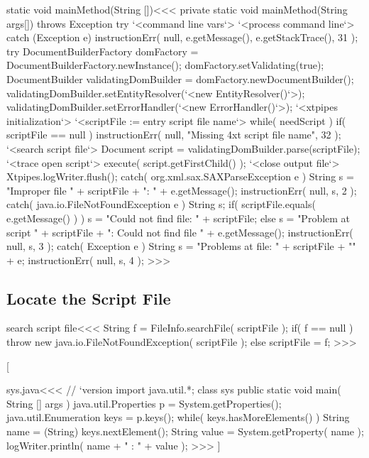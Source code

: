 \documentclass{article}
\begin{document}
{\<static void mainMethod(String [])\><<<
private static void mainMethod(String args[]) throws Exception {
  try{
    `<command line vars`>
    `<process command line`>
  } catch (Exception e){
     instructionErr( null, e.getMessage(), e.getStackTrace(), 31 );
  }
  try {
     DocumentBuilderFactory domFactory =
           DocumentBuilderFactory.newInstance();
     domFactory.setValidating(true);
     DocumentBuilder validatingDomBuilder =
                     domFactory.newDocumentBuilder();
     validatingDomBuilder.setEntityResolver(`<new EntityResolver()`>);
     validatingDomBuilder.setErrorHandler(`<new ErrorHandler()`>);
     `<xtpipes initialization`>
     `<scriptFile := entry script file name`>
     while( needScript ){
       if( scriptFile == null ){
          instructionErr( null, "Missing 4xt script file name", 32 );
       }
       `<search script file`>
       Document script = validatingDomBuilder.parse(scriptFile);
       `<trace open script`>
       execute( script.getFirstChild() );
     }
     `<close output file`>
      Xtpipes.logWriter.flush();
  } catch( org.xml.sax.SAXParseException e ){
     String s = "Improper file " + scriptFile + ": " + e.getMessage();
     instructionErr( null, s, 2 );
  } catch( java.io.FileNotFoundException e ){
     String s;
     if( scriptFile.equals( e.getMessage() ) ){
        s =  "Could not find file: " + scriptFile;
     } else {
        s = "Problem at script " + scriptFile + ": Could not find file "
                                                     + e.getMessage();
     }
     instructionErr( null, s, 3 );
  } catch( Exception e ){
     String s = "Problems at file: " + scriptFile + "\n   " + e;
     instructionErr( null, s, 4 );
} }
>>>






\subsection{Locate the Script File}




\<search script file\><<<
String f = FileInfo.searchFile( scriptFile );
if( f == null ){
   throw new java.io.FileNotFoundException( scriptFile );
} else {
   scriptFile = f;
}
>>>



[

\<sys.java\><<<
// `version
import java.util.*;
class sys{
  public static void main( String [] args ) {
     java.util.Properties p = System.getProperties();
     java.util.Enumeration keys = p.keys();
     while( keys.hasMoreElements() ) {
         String name = (String) keys.nextElement();
         String value = System.getProperty( name );
         logWriter.println( name + " : " + value );
} }  }
>>>
\EndHPage{}]


}
\end{document}
